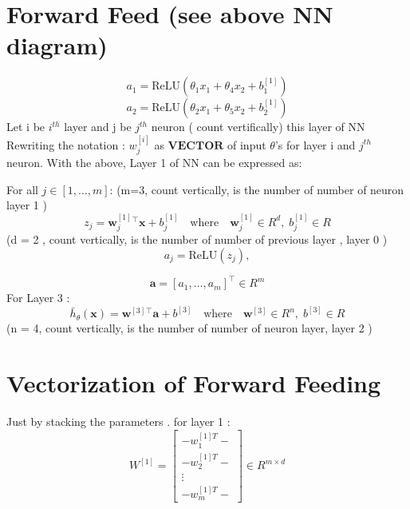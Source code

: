 \documentclass{article}
\begin{document}
\section{Forward Feed (see above NN diagram) }
\[a_1 = \text{ReLU}(\theta_1 x_1 + \theta_4 x_2 + b_{1}^{[1]})\]
\[a_2 = \text{ReLU}(\theta_2 x_1 + \theta_5 x_2 + b_{2}^{[1]})\]
Let i be \(i^{th}\) layer and j be \(j^{th}\) neuron ( count vertifically) this layer of NN \newline 
Rewriting the notation : \(w_{j}^{[i]}\) as \(\textbf{VECTOR}\) of input \(\theta\)'s for layer i and \(j^{th}\) neuron. \newline
With the above, Layer 1 of NN can be expressed as: \newline 

For all \( j \in [1, \dots, m] \): (m=3, count vertically, is the number of number of neuron layer 1 )
\[
z_j = \mathbf{w}^{[1]}_j{}^\top \mathbf{x} + b^{[1]}_j \quad \text{where} \quad \mathbf{w}^{[1]}_j \in R^d, \; b^{[1]}_j \in R
\]
(d = 2 , count vertically, is the number of number of previous layer , layer 0 )
\[
a_j = \text{ReLU}(z_j),
\]

\[
\mathbf{a} = [a_1, \dots, a_m]^\top \in R^m
\]
For Layer 3 :
\[
\bar{h}_\theta(\mathbf{x}) = \mathbf{w}^{[3]}{}^\top \mathbf{a} + b^{[3]} \quad \text{where} \quad \mathbf{w}^{[3]} \in R^n, \; b^{[3]} \in R
\] 
(n = 4, count vertically, is the number of number of neuron  layer, layer 2  )
\section{Vectorization of Forward Feeding}

Just by stacking the parameters . for layer 1 : 
\[W^{[1]} = \begin{bmatrix} - w^{[1]T}_1 - \\ - w^{[1]T}_2 - \\ \vdots \\ - w^{[1]T}_m - \end{bmatrix} \in R^{m \times d}\]
\end{document}
